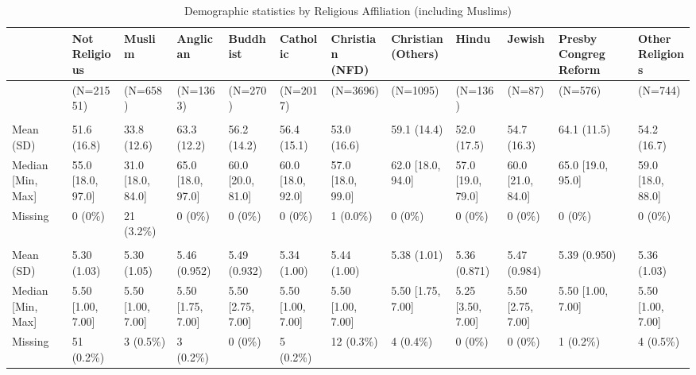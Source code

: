 \documentclass[
  single column]{article}
\begin{document}
\begin{landscape}


\begin{longtable}[t]{llllllllllll}

\caption{\label{tbl-demography}Demographic statistics by Religious
Affiliation (including Muslims)}

\tabularnewline

\toprule
  & Not Religious & Muslim & Anglican & Buddhist & Catholic & Christian (NFD) & Christian (Others) & Hindu & Jewish & Presby Congreg Reform & Other Religions\\
\midrule
 & (N=21551) & (N=658) & (N=1363) & (N=270) & (N=2017) & (N=3696) & (N=1095) & (N=136) & (N=87) & (N=576) & (N=744)\\
\addlinespace[0.3em]
\multicolumn{12}{l}{\textbf{Age}}\\
\hspace{1em}Mean (SD) & 51.6 (16.8) & 33.8 (12.6) & 63.3 (12.2) & 56.2 (14.2) & 56.4 (15.1) & 53.0 (16.6) & 59.1 (14.4) & 52.0 (17.5) & 54.7 (16.3) & 64.1 (11.5) & 54.2 (16.7)\\
\hspace{1em}Median [Min, Max] & 55.0 [18.0, 97.0] & 31.0 [18.0, 84.0] & 65.0 [18.0, 97.0] & 60.0 [20.0, 81.0] & 60.0 [18.0, 92.0] & 57.0 [18.0, 99.0] & 62.0 [18.0, 94.0] & 57.0 [19.0, 79.0] & 60.0 [21.0, 84.0] & 65.0 [19.0, 95.0] & 59.0 [18.0, 88.0]\\
\hspace{1em}Missing & 0 (0\%) & 21 (3.2\%) & 0 (0\%) & 0 (0\%) & 0 (0\%) & 1 (0.0\%) & 0 (0\%) & 0 (0\%) & 0 (0\%) & 0 (0\%) & 0 (0\%)\\
\addlinespace[0.3em]
\multicolumn{12}{l}{\textbf{Agreeableness (Personality Trait)}}\\
\hspace{1em}Mean (SD) & 5.30 (1.03) & 5.30 (1.05) & 5.46 (0.952) & 5.49 (0.932) & 5.34 (1.00) & 5.44 (1.00) & 5.38 (1.01) & 5.36 (0.871) & 5.47 (0.984) & 5.39 (0.950) & 5.36 (1.03)\\
\hspace{1em}Median [Min, Max] & 5.50 [1.00, 7.00] & 5.50 [1.00, 7.00] & 5.50 [1.75, 7.00] & 5.50 [2.75, 7.00] & 5.50 [1.00, 7.00] & 5.50 [1.00, 7.00] & 5.50 [1.75, 7.00] & 5.25 [3.50, 7.00] & 5.50 [2.75, 7.00] & 5.50 [1.00, 7.00] & 5.50 [1.00, 7.00]\\
\hspace{1em}Missing & 51 (0.2\%) & 3 (0.5\%) & 3 (0.2\%) & 0 (0\%) & 5 (0.2\%) & 12 (0.3\%) & 4 (0.4\%) & 0 (0\%) & 0 (0\%) & 1 (0.2\%) & 4 (0.5\%)\\

\end{longtable}
\end{landscape}
\end{document}
